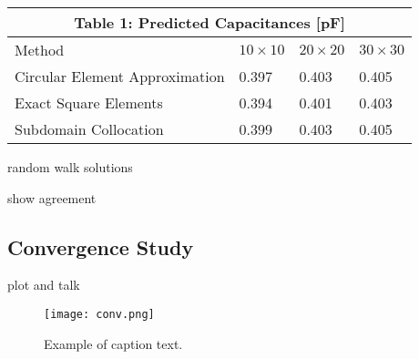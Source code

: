\begin{tabular}{ |p{2cm}||p{1cm}|p{1cm}|p{1cm}|}
	\multicolumn{4}{c}{Table 1: Predicted Capacitances [pF]} \\
	\hline
	Method & $10\times10$ & $20\times20$ & $30\times30$ \\
	\hline
	Circular Element Approximation   & 0.397 &0.403 & 0.405\\
	\hline
	Exact Square Elements& 0.394& 0.401 & 0.403\\
	\hline
	Subdomain Collocation&0.399 & 0.403 & 0.405 \\
	\hline
   \end{tabular}

random walk solutions

show agreement


\subsection{Convergence Study}
\label{subsec:cs}
 plot and talk
 \begin{figure}[t!]  
	\centering
	\texttt{[image: conv.png]} 
	\caption{Example of caption text.}
	\label{fig:convergence}
\end{figure}